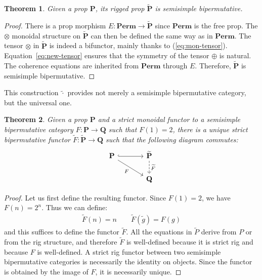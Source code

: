 \documentclass[a4paper]{article}
\theoremstyle{plain}
\newtheorem{theorem}{Theorem}
\theoremstyle{definition}
\newcommand{\cat}[1]{\mathbf{#1}}
\newcommand{\kcat}[1]{\mathbf{\widetilde{#1}}}
\begin{document}
\begin{theorem}
	\label{th:krig}
	Given a prop $\cat P$, its rigged prop $\kcat P$ is semisimple
	bipermutative.
\end{theorem}
 \begin{proof}
	There is a prop morphism $E \colon \cat{Perm} \to \kcat P$ since
	$\cat{Perm}$ is the free prop. The $\otimes$ monoidal structure on $\kcat
	P$ can then be defined the same way as in $\cat{Perm}$. The tensor
	$\otimes$ in $\kcat P$ is indeed a bifunctor, mainly thanks to
	(\ref{eq:mon-tensor}). Equation~\eqref{eq:new-tensor} ensures that the
	symmetry of the tensor $\oplus$ is natural. The coherence equations are
	inherited from $\cat{Perm}$ through $E$. Therefore, $\kcat P$ is
	semisimple bipermutative.
 \end{proof}

This construction $\kcat \cdot$ provides not merely a semisimple bipermutative
category, but the universal one.

\begin{theorem}
	\label{th:kuniv}
	Given a prop $\cat P$ and a strict monoidal functor to a semisimple
	bipermutative category $F \colon \cat P \to \cat Q$ such that $F(1) = 2$,
	there is a unique strict bipermutative functor $\widetilde F \colon \kcat P
	\to \cat Q$ such that the following diagram commutes:
	\[
		\begin{tikzcd}[column sep=large]
			\cat P & \kcat P \\
			& \cat Q
			\arrow[hook, from=1-1, to=1-2]
			\arrow["F"', from=1-1, to=2-2]
			\arrow[dashed, "\widetilde F", from=1-2, to=2-2]
		\end{tikzcd}
	\]
\end{theorem}
\begin{proof}
	Let us first define the resulting functor. Since $F(1)=2$, we have
	$F(n) = 2^n$. Thus we can define:
	\[
		\begin{array}{c}
			\widetilde F (n) = n
			\qquad
			\widetilde F(\widetilde g) = F(g)
		\end{array}
	\]
	and this suffices to define the functor $\widetilde F$. All the equations
	in $\widetilde P$ derive from $P$ or from the rig structure, and therefore
	$\widetilde F$ is well-defined because it is strict rig and because $F$ is
	well-defined.
	A strict rig functor between two semisimple bipermutative categories is
	necessarily the identity on objects. Since the functor is obtained by the image
	of $F$, it is necessarily unique.
\end{proof}
\end{document}
